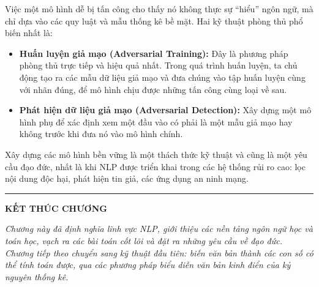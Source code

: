 Việc một mô hình dễ bị tấn công cho thấy nó không thực sự “hiểu” ngôn ngữ, mà chỉ dựa vào các quy luật và mẫu thống kê bề mặt. Hai kỹ thuật phòng thủ phổ biến nhất là:
\begin{itemize}
    \item \textbf{Huấn luyện giả mạo (Adversarial Training):} Đây là phương pháp phòng thủ trực tiếp và hiệu quả nhất. Trong quá trình huấn luyện, ta chủ động tạo ra các mẫu dữ liệu giả mạo và đưa chúng vào tập huấn luyện cùng với nhãn đúng, để mô hình chịu được những tấn công cùng loại về sau.
    \item \textbf{Phát hiện dữ liệu giả mạo (Adversarial Detection):} Xây dựng một mô hình phụ để xác định xem một đầu vào có phải là một mẫu giả mạo hay không trước khi đưa nó vào mô hình chính.
\end{itemize}

Xây dựng các mô hình bền vững là một thách thức kỹ thuật và cũng là một yêu cầu đạo đức, nhất là khi NLP được triển khai trong các hệ thống rủi ro cao: lọc nội dung độc hại, phát hiện tin giả, các ứng dụng an ninh mạng.

\bigskip
\hrule
\bigskip

\begin{center}
    \textbf{\Large KẾT THÚC CHƯƠNG \thechapter}
\end{center}

\textit{Chương này đã định nghĩa lĩnh vực NLP, giới thiệu các nền tảng ngôn ngữ học và toán học, vạch ra các bài toán cốt lõi và đặt ra những yêu cầu về đạo đức. Chương tiếp theo chuyển sang kỹ thuật đầu tiên: biến văn bản thành các con số có thể tính toán được, qua các phương pháp biểu diễn văn bản kinh điển của kỷ nguyên thống kê.}